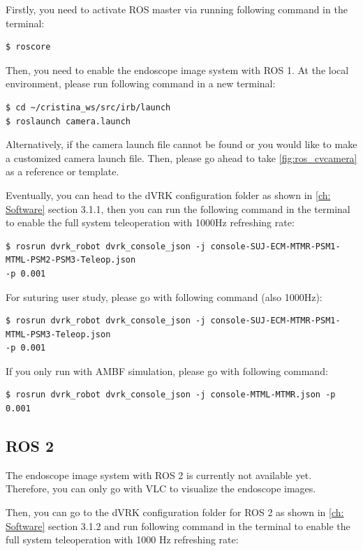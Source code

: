 Firstly, you need to activate ROS master via running following command in the terminal:

\begin{verbatim}
$ roscore
\end{verbatim}

Then, you need to enable the endoscope image system with ROS 1. At the local environment, please run following command in a new terminal:

\begin{verbatim}
$ cd ~/cristina_ws/src/irb/launch
$ roslaunch camera.launch
\end{verbatim}

Alternatively, if the camera launch file cannot be found or you would like to make a customized camera launch file. Then, please go ahead to take \autoref{fig:ros_cvcamera} as a reference or template.

Eventually, you can head to the dVRK configuration folder as shown in \autoref{ch: Software} section 3.1.1, then you can run the following command in the terminal to enable the full system teleoperation with 1000Hz refreshing rate:

\begin{verbatim}
$ rosrun dvrk_robot dvrk_console_json -j console-SUJ-ECM-MTMR-PSM1-MTML-PSM2-PSM3-Teleop.json
-p 0.001
\end{verbatim}

For suturing user study, please go with following command (also 1000Hz):

\begin{verbatim}
$ rosrun dvrk_robot dvrk_console_json -j console-SUJ-ECM-MTMR-PSM1-MTML-PSM3-Teleop.json
-p 0.001
\end{verbatim}

If you only run with AMBF simulation, please go with following command:

\begin{verbatim}
$ rosrun dvrk_robot dvrk_console_json -j console-MTML-MTMR.json -p 0.001
\end{verbatim}

\subsection{ROS 2}

The endoscope image system with ROS 2 is currently not available yet. Therefore, you can only go with VLC to visualize the endoscope images.

Then, you can go to the dVRK configuration folder for ROS 2 as shown in \autoref{ch: Software} section 3.1.2 and run following command in the terminal to enable the full system teleoperation with 1000 Hz refreshing rate:

